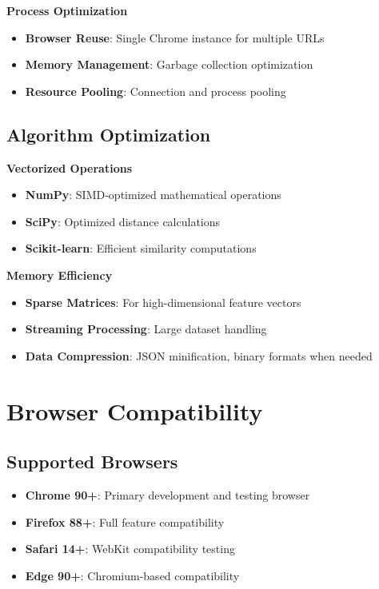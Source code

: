 \textbf{Process Optimization}
\begin{itemize}
    \item \textbf{Browser Reuse}: Single Chrome instance for multiple URLs
    \item \textbf{Memory Management}: Garbage collection optimization
    \item \textbf{Resource Pooling}: Connection and process pooling
\end{itemize}

\subsection{Algorithm Optimization}
\label{subsec:algorithm-optimization}

\textbf{Vectorized Operations}
\begin{itemize}
    \item \textbf{NumPy}: SIMD-optimized mathematical operations
    \item \textbf{SciPy}: Optimized distance calculations
    \item \textbf{Scikit-learn}: Efficient similarity computations
\end{itemize}

\textbf{Memory Efficiency}
\begin{itemize}
    \item \textbf{Sparse Matrices}: For high-dimensional feature vectors
    \item \textbf{Streaming Processing}: Large dataset handling
    \item \textbf{Data Compression}: JSON minification, binary formats when needed
\end{itemize}

\section{Browser Compatibility}
\label{sec:browser-compatibility}

\subsection{Supported Browsers}
\label{subsec:supported-browsers}

\begin{itemize}
    \item \textbf{Chrome 90+}: Primary development and testing browser
    \item \textbf{Firefox 88+}: Full feature compatibility
    \item \textbf{Safari 14+}: WebKit compatibility testing
    \item \textbf{Edge 90+}: Chromium-based compatibility
\end{itemize}

